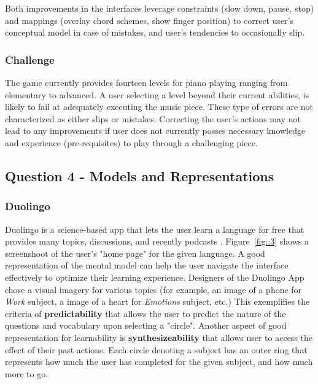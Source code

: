 \documentclass[12pt,letterpaper]{article}
\begin{document}
Both improvements in the interfaces leverage constraints (slow down, pause, stop) and mappings (overlay chord schemes, show finger position) to correct user's conceptual model in case of mistakes, and user's tendencies to occasionally slip.

\subsubsection*{Challenge}
The game currently provides fourteen levels for piano playing ranging from elementary to advanced. A user selecting a level beyond their current abilities, is likely to fail at adequately executing the music piece. These type of errors are not characterized as either slips or mistakes. Correcting the user's actions may not lead to any improvements if user does not currently posses necessary knowledge and experience (pre-requisites) to play through a challenging piece.  

\subsection*{Question 4 - Models and Representations}

\subsubsection*{Duolingo}
Duolingo is a science-based app that lets the user learn a language for free that provides many topics, discussions, and recently podcasts \cite{von2013duolingo}. Figure~\ref{fig::3} shows a screenshoot of the user's "home page" for the given language. A good representation of the mental model can help the user navigate the interface effectively to optimize their learning experience. Designers of the Duolingo App chose a visual imagery for various topics (for example, an image of a phone for \textit{Work} subject, a image of a heart for \textit{Emotions} subject, etc.) This exemplifies the criteria of \textbf{predictability} that allows the user to predict the nature of the questions and vocabulary upon selecting a "circle". Another aspect of good representation for learnability is \textbf{synthesizeability} that allows user to access the effect of their past actions. Each circle denoting a subject has an outer ring that represents how much the user has completed for the given subject, and how much more to go.
\end{document}
